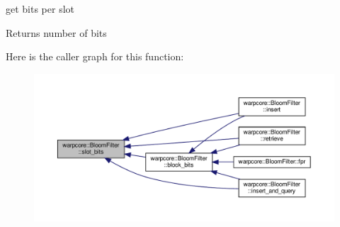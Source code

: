 get bits per slot 

\begin{DoxyReturn}{Returns}
number of bits 
\end{DoxyReturn}
Here is the caller graph for this function\+:
\nopagebreak
\begin{figure}[H]
\begin{center}
\leavevmode
\includegraphics[width=350pt]{classwarpcore_1_1BloomFilter_a8dca50765c601cca8d85621fa8488ecc_icgraph}
\end{center}
\end{figure}
